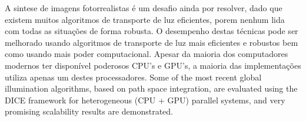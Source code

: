A sintese de imagens fotorrealistas é um desafio ainda por resolver, dado que existem muitos algoritmos de transporte de luz eficientes, porem nenhum lida com todas as situações de forma robusta. O desempenho destas técnicas pode ser melhorado usando algoritmos de transporte de luz mais eficientes e robustos bem como usando mais poder computacional. Apesar da maioria dos computadores modernos ter disponível poderosos CPU's e GPU's, a maioria das implementações utiliza apenas um destes processadores. Some of the most recent global illumination algorithms, based on path space integration, are evaluated using the DICE framework for heterogeneous (CPU + GPU) parallel systems, and very promising scalability results are demonstrated.

